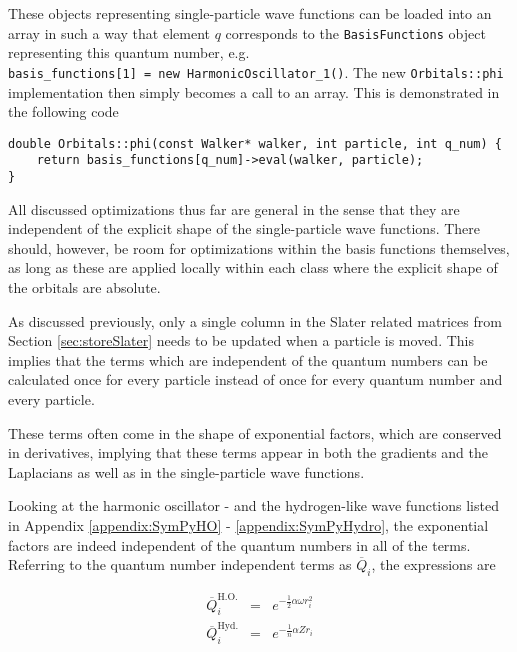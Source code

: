 These objects representing single-particle wave functions can be loaded into an array in such a way that element $q$ corresponds to the \verb+BasisFunctions+ object representing this quantum number, e.g.~\\\verb+basis_functions[1] = new HarmonicOscillator_1()+. The new \verb+Orbitals::phi+ implementation then simply becomes a call to an array. This is demonstrated in the following code

\vspace{0.25cm}
\begin{lstlisting}[caption={The implementation of the single-particle basis used in the code. It is simply a call to an array holding all the different single-particle wave functions. The quantum number is used as an index, and the corresponding evaluation function is called with the supplied walker for the given particle.}]
double Orbitals::phi(const Walker* walker, int particle, int q_num) {
    return basis_functions[q_num]->eval(walker, particle);
}
\end{lstlisting}

All discussed optimizations thus far are general in the sense that they are independent of the explicit shape of the single-particle wave functions. There should, however, be room for optimizations within the basis functions themselves, as long as these are applied locally within each class where the explicit shape of the orbitals are absolute.

As discussed previously, only a single column in the Slater related matrices from Section \ref{sec:storeSlater} needs to be updated when a particle is moved. This implies that the terms which are independent of the quantum numbers can be calculated once for every particle instead of once for every quantum number and every particle. 

These terms often come in the shape of exponential factors, which are conserved in derivatives, implying that these terms appear in both the gradients and the Laplacians as well as in the single-particle wave functions.

Looking at the harmonic oscillator - and the hydrogen-like wave functions listed in Appendix \ref{appendix:SymPyHO} - \ref{appendix:SymPyHydro}, the exponential factors are indeed independent of the quantum numbers in all of the terms. Referring to the quantum number independent terms as $\overline{Q}_i$, the expressions are 

\begin{eqnarray}
\overline{Q}_i^\mathrm{H.O.} &=& e^{-\frac{1}{2}\alpha\omega r_i^2} \\
 \overline{Q}_i^\mathrm{Hyd.} &=& e^{-\frac{1}{n}\alpha Z r_i}
\end{eqnarray}

